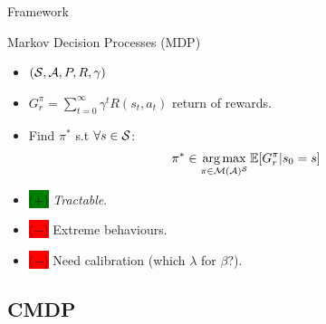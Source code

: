 \documentclass{beamer}
\newcommand{\cplus}{\colorbox{green}{($+$)} }
\newcommand{\cmoins}{\colorbox{red}{($-$)} }
\begin{document}
    \begin{frame}{Framework}
        \begin{block}{Markov Decision Processes (MDP)}
            \begin{itemize}
                \item $(\mathcal{S}, \mathcal{A}, P, R, \gamma)$
                \item $G_r^\pi = \sum_{t=0}^\infty \gamma^t R(s_t, a_t)$ return of rewards.
                \item Find $\pi^*$ s.t $\forall s\in\mathcal{S}$:
                \begin{equation}
                    \label{eq:mdp}
                    \begin{array}{lcr}
                        \displaystyle \pi^* \in \operatorname*{arg\,max}_{\pi\in\mathcal{M}(\mathcal{A})^{\mathcal{S}}} \operatorname*{\mathbb{E}}[G_r^\pi | s_0=s]
                    \end{array}
                \end{equation}

            \end{itemize}
        \end{block}


        \begin{block}{}
            \begin{itemize}
                \item \cplus \textit{Tractable}.
                \item \cmoins Extreme behaviours.
                \item \cmoins Need calibration (which $\lambda$ for $\beta$?).
            \end{itemize}
        \end{block}

    \end{frame}

    \subsection{CMDP}
\end{document}
